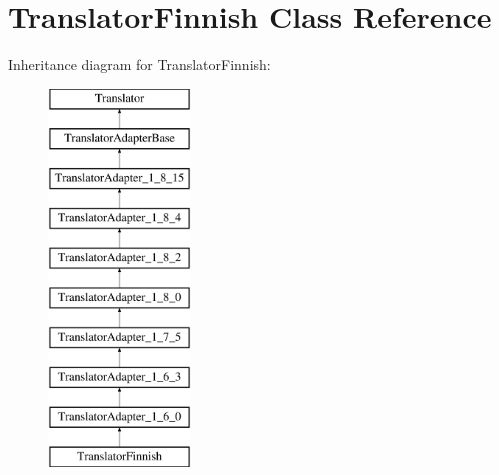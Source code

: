 \hypertarget{class_translator_finnish}{}\section{Translator\+Finnish Class Reference}
\label{class_translator_finnish}
Inheritance diagram for Translator\+Finnish\+:\begin{figure}[H]
\begin{center}
\leavevmode
\includegraphics[height=10.000000cm]{class_translator_finnish}
\end{center}
\end{figure}
